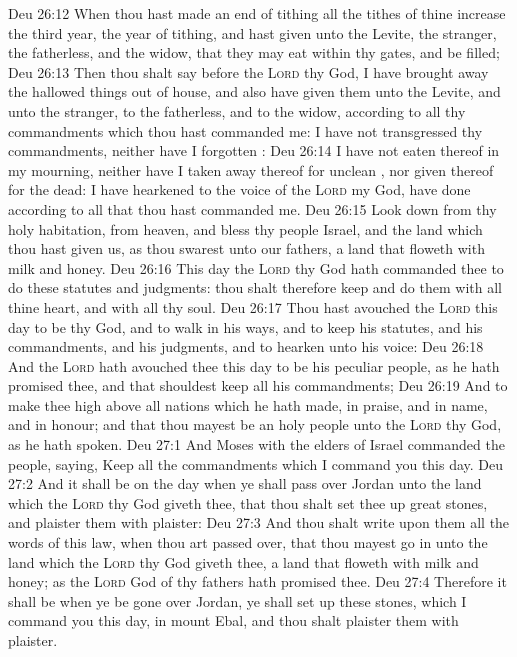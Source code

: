 \vs Deu 26:12 When thou hast made an end of tithing all the tithes of thine increase the third year,  the year of tithing, and hast given  unto the Levite, the stranger, the fatherless, and the widow, that they may eat within thy gates, and be filled;
\vs Deu 26:13 Then thou shalt say before the \textsc{Lord} thy God, I have brought away the hallowed things out of  house, and also have given them unto the Levite, and unto the stranger, to the fatherless, and to the widow, according to all thy commandments which thou hast commanded me: I have not transgressed thy commandments, neither have I forgotten :
\vs Deu 26:14 I have not eaten thereof in my mourning, neither have I taken away  thereof for  unclean , nor given  thereof for the dead:  I have hearkened to the voice of the \textsc{Lord} my God,  have done according to all that thou hast commanded me.
\vs Deu 26:15 Look down from thy holy habitation, from heaven, and bless thy people Israel, and the land which thou hast given us, as thou swarest unto our fathers, a land that floweth with milk and honey.
\vs Deu 26:16 This day the \textsc{Lord} thy God hath commanded thee to do these statutes and judgments: thou shalt therefore keep and do them with all thine heart, and with all thy soul.
\vs Deu 26:17 Thou hast avouched the \textsc{Lord} this day to be thy God, and to walk in his ways, and to keep his statutes, and his commandments, and his judgments, and to hearken unto his voice:
\vs Deu 26:18 And the \textsc{Lord} hath avouched thee this day to be his peculiar people, as he hath promised thee, and that  shouldest keep all his commandments;
\vs Deu 26:19 And to make thee high above all nations which he hath made, in praise, and in name, and in honour; and that thou mayest be an holy people unto the \textsc{Lord} thy God, as he hath spoken.
\vs Deu 27:1 And Moses with the elders of Israel commanded the people, saying, Keep all the commandments which I command you this day.
\vs Deu 27:2 And it shall be on the day when ye shall pass over Jordan unto the land which the \textsc{Lord} thy God giveth thee, that thou shalt set thee up great stones, and plaister them with plaister:
\vs Deu 27:3 And thou shalt write upon them all the words of this law, when thou art passed over, that thou mayest go in unto the land which the \textsc{Lord} thy God giveth thee, a land that floweth with milk and honey; as the \textsc{Lord} God of thy fathers hath promised thee.
\vs Deu 27:4 Therefore it shall be when ye be gone over Jordan,  ye shall set up these stones, which I command you this day, in mount Ebal, and thou shalt plaister them with plaister.
